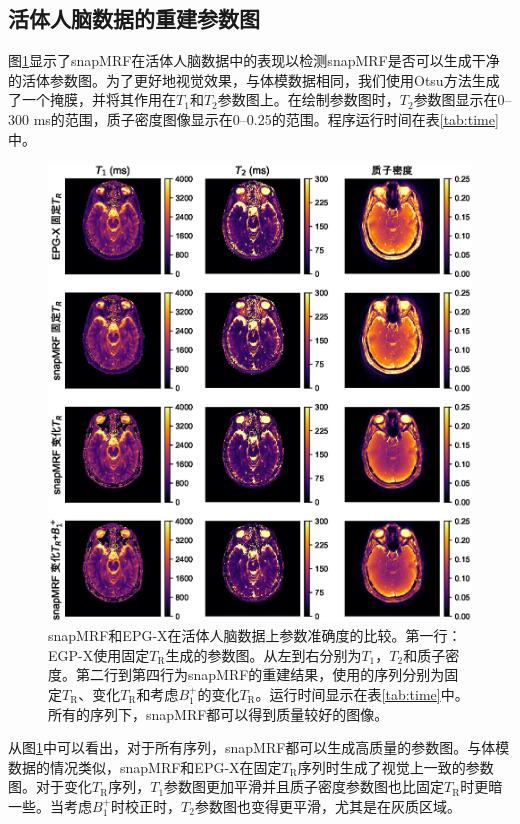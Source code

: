 \subsection{活体人脑数据的重建参数图}
图\ref{fig:brain}显示了snapMRF在活体人脑数据中的表现以检测snapMRF是否可以生成干净的活体参数图。为了更好地视觉效果，与体模数据相同，我们使用Otsu方法生成了一个掩膜，并将其作用在$T_1$和$T_2$参数图上。在绘制参数图时，$T_2$参数图显示在0--300 ms的范围，质子密度图像显示在0--0.25的范围。程序运行时间在表\ref{tab:time}中。

\begin{figure}[htbp]
\centerline{\includegraphics[width=1\textwidth]{img/snapmrf/figure3.eps}}
\caption{snapMRF和EPG-X在活体人脑数据上参数准确度的比较。第一行：EGP-X使用固定$T_\mathrm{R}$生成的参数图。从左到右分别为$T_1$，$T_2$和质子密度。第二行到第四行为snapMRF的重建结果，使用的序列分别为固定$T_\mathrm{R}$、变化$T_\mathrm{R}$和考虑$B_1^+$的变化$T_\mathrm{R}$。运行时间显示在表\ref{tab:time}中。所有的序列下，snapMRF都可以得到质量较好的图像。}
\label{fig:brain}
\end{figure}

从图\ref{fig:brain}中可以看出，对于所有序列，snapMRF都可以生成高质量的参数图。与体模数据的情况类似，snapMRF和EPG-X在固定$T_\mathrm{R}$序列时生成了视觉上一致的参数图。对于变化$T_\mathrm{R}$序列，$T_1$参数图更加平滑并且质子密度参数图也比固定$T_\mathrm{R}$时更暗一些。当考虑$B_1^+$时校正时，$T_2$参数图也变得更平滑，尤其是在灰质区域。

